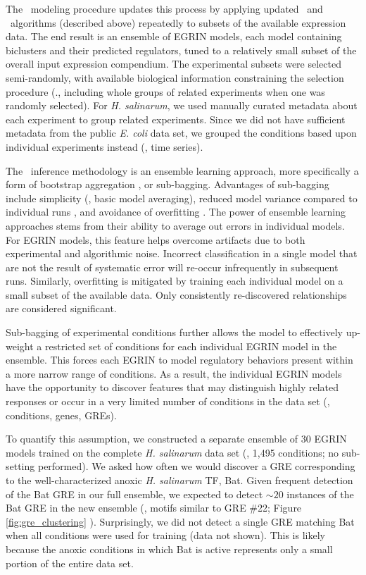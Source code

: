 The \egrine~modeling procedure updates this process by applying updated \cm\ and \nwinf\ algorithms (described above) repeatedly to subsets of the available expression data. The end result is an ensemble of EGRIN models, each model containing biclusters and their predicted regulators, tuned to a relatively small subset of the overall input expression compendium. The experimental subsets were selected semi-randomly, with available biological information constraining the selection procedure (\ie., including whole groups of related experiments when one was randomly selected). For {\it H. salinarum}, we used manually curated metadata about each experiment to group related experiments. Since we did not have sufficient metadata from the public \textit{E. coli} data set, we grouped the conditions based upon individual experiments instead (\eg, time series).

The \egrine~inference methodology is an ensemble learning approach, more specifically a form of bootstrap aggregation \cite{breiman_bagging_1996}, or sub-bagging. Advantages of sub-bagging include simplicity (\ie, basic model averaging), reduced model variance compared to individual runs \cite{bhlmann_analyzing_2002}, and avoidance of overfitting \cite{krogh_statistical_1997}. The power of ensemble learning approaches stems from their ability to average out errors in individual models. For EGRIN models, this feature helps overcome artifacts due to both experimental and algorithmic noise. Incorrect classification in a single model that are not the result of systematic error will re-occur infrequently in subsequent runs. Similarly, overfitting is mitigated by training each individual model on a small subset of the available data. Only consistently re-discovered relationships are considered significant.

Sub-bagging of experimental conditions further allows the model to effectively up-weight a restricted set of conditions for each individual EGRIN model in the ensemble. This forces each EGRIN to model regulatory behaviors present within a more narrow range of conditions. As a result, the individual EGRIN models have the opportunity to discover features that may distinguish highly related responses or occur in a very limited number of conditions in the data set (\eg, conditions, genes, GREs).

To quantify this assumption, we constructed a separate ensemble of 30 EGRIN models trained on the complete {\it H. salinarum} data set (\ie, 1,495 conditions; no sub-setting performed). We asked how often we would discover a GRE corresponding to the well-characterized anoxic \textit{H. salinarum} TF, Bat.  Given frequent detection of the Bat GRE in our full ensemble, we expected to detect $\sim 20$ instances of the Bat GRE in the new ensemble (\ie, motifs similar to GRE \#22; Figure \ref{fig:gre_clustering} \cite{baliga_genomic_2001}). Surprisingly, we did not detect a single GRE matching Bat when all conditions were used for training (data not shown).  This is likely because the anoxic conditions in which Bat is active represents only a small portion of the entire data set.


